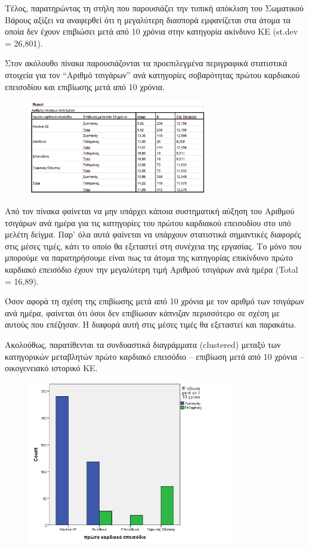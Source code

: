 Τέλος,  παρατηρώντας τη στήλη που παρουσιάζει την τυπική απόκλιση του Σωματικού Βάρους αξίζει να αναφερθεί ότι η μεγαλύτερη διασπορά εμφανίζεται στα άτομα τα οποία δεν έχουν επιβιώσει μετά από 10 χρόνια στην κατηγορία ακίνδυνο ΚΕ (st.dev = 26,801).

\clearpage
Στον ακόλουθο πίνακα παρουσιάζονται τα προεπιλεγμένα περιγραφικά στατιστικά στοιχεία για τον “Αριθμό τσιγάρων” ανά κατηγορίες σοβαρότητας πρώτου καρδιακού επεισοδίου και επιβίωσης μετά από 10 χρόνια.

\begin{figure}[hb]
        \centering
        \includegraphics[width=0.7\textwidth]{images/26.PNG}
    \end{figure}
    
Από τον πίνακα φαίνεται να μην υπάρχει κάποια συστηματική αύξηση του Αριθμού τσιγάρων ανά ημέρα  για τις κατηγορίες του πρώτου καρδιακού επεισοδίου στο υπό μελέτη δείγμα. Παρ’ όλα αυτά φαίνεται να υπάρχουν στατιστικά σημαντικές διαφορές στις μέσες τιμές, κάτι το οποίο θα εξεταστεί στη συνέχεια της εργασίας. Το μόνο που μπορούμε να παρατηρήσουμε είναι πως τα άτομα της κατηγορίας επικίνδυνο πρώτο καρδιακό επεισόδιο έχουν την μεγαλύτερη τιμή Αριθμού τσιγάρων ανά ημέρα (Total = 16,89). 

Όσον αφορά τη σχέση της επιβίωσης μετά από 10 χρόνια με τον αριθμό των τσιγάρων ανά ημέρα, φαίνεται ότι όσοι δεν επιβίωσαν κάπνιζαν περισσότερο σε σχέση με αυτούς που επέζησαν. Η διαφορά αυτή στις μέσες τιμές θα εξεταστεί και παρακάτω. 

\clearpage
Ακολούθως, παρατίθενται τα συνδυαστικά διαγράμματα (clustered) μεταξύ των κατηγορικών μεταβλητών πρώτο καρδιακό επεισόδιο – επιβίωση μετά από 10 χρόνια – οικογενειακό ιστορικό ΚΕ.  
\begin{figure}[hb]
        \centering
        \includegraphics[width=0.8\textwidth]{images/27.png}
    \end{figure}
    
